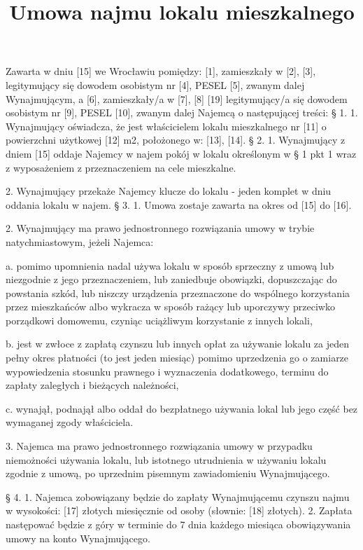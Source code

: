 \documentclass[a4paper,11pt, notitlepage]{article}
\title{Umowa najmu lokalu mieszkalnego}
\author{}
\date{}
\begin{document}
\maketitle

Zawarta w dniu [15] we Wrocławiu pomiędzy:
[1], zamieszkały w [2], [3], legitymujący się dowodem osobistym nr [4], PESEL [5], zwanym dalej Wynajmującym, a
[6], zamieszkały/a w [7], [8] [19] legitymujący/a się dowodem osobistym nr [9], PESEL [10], zwanym dalej Najemcą o następującej treści:
§ 1.
    1. Wynajmujący oświadcza, że jest właścicielem lokalu mieszkalnego nr [11] o powierzchni użytkowej [12] m2, położonego 	w: [13], [14].
§ 2.
    1. Wynajmujący z dniem [15] oddaje Najemcy w najem pokój w lokalu określonym w § 1 pkt 1 wraz z wyposażeniem z przeznaczeniem na cele mieszkalne.
 	
    2. Wynajmujący przekaże Najemcy klucze do lokalu - jeden komplet w dniu oddania lokalu w najem. 
§ 3.
    1. Umowa zostaje zawarta na okres od [15] do [16].
 	
    2. Wynajmujący ma prawo jednostronnego rozwiązania umowy w trybie natychmiastowym, jeżeli Najemca:
 	
        a. pomimo upomnienia nadal używa lokalu w sposób sprzeczny z umową lub niezgodnie z jego przeznaczeniem, lub zaniedbuje obowiązki, dopuszczając do powstania szkód, lub niszczy urządzenia	przeznaczone do wspólnego korzystania przez mieszkańców albo wykracza w sposób rażący lub uporczywy przeciwko porządkowi domowemu, czyniąc uciążliwym korzystanie z innych lokali, 
 		
        b. jest w zwłoce z zapłatą czynszu lub innych opłat za używanie lokalu za jeden pełny okres płatności (to jest jeden miesiąc) 	pomimo uprzedzenia go o zamiarze wypowiedzenia stosunku prawnego i wyznaczenia dodatkowego, terminu do zapłaty zaległych i bieżących należności, 		
 		
        c. wynajął, podnajął albo oddał do bezpłatnego używania lokal lub jego część bez wymaganej zgody właściciela.
 	
    3. Najemca ma prawo jednostronnego rozwiązania umowy w przypadku niemożności używania lokalu, lub istotnego utrudnienia w używaniu lokalu zgodnie z umową, po uprzednim pisemnym zawiadomieniu Wynajmującego.

§ 4.
    1. Najemca zobowiązany będzie do zapłaty Wynajmującemu czynszu najmu w wysokości:
[17] złotych miesięcznie od osoby (słownie: [18] złotych).
    2. Zapłata następować będzie z góry w terminie do 7 dnia każdego 	miesiąca obowiązywania umowy na konto Wynajmującego.
 	
\end{document}
